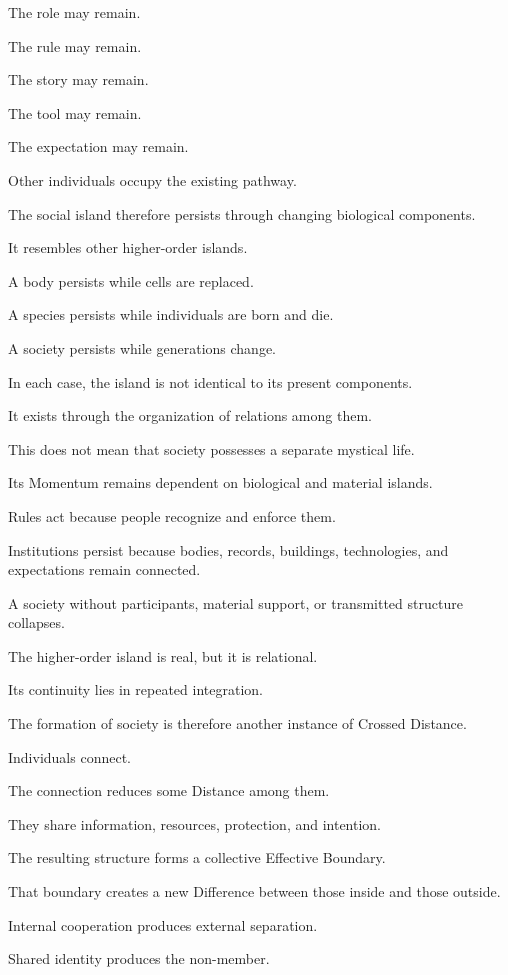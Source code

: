 The role may remain.

The rule may remain.

The story may remain.

The tool may remain.

The expectation may remain.

Other individuals occupy the existing pathway.

The social island therefore persists through changing biological components.

It resembles other higher-order islands.

A body persists while cells are replaced.

A species persists while individuals are born and die.

A society persists while generations change.

In each case, the island is not identical to its present components.

It exists through the organization of relations among them.

This does not mean that society possesses a separate mystical life.

Its Momentum remains dependent on biological and material islands.

Rules act because people recognize and enforce them.

Institutions persist because bodies, records, buildings, technologies, and expectations remain connected.

A society without participants, material support, or transmitted structure collapses.

The higher-order island is real, but it is relational.

Its continuity lies in repeated integration.

The formation of society is therefore another instance of Crossed Distance.

Individuals connect.

The connection reduces some Distance among them.

They share information, resources, protection, and intention.

The resulting structure forms a collective Effective Boundary.

That boundary creates a new Difference between those inside and those outside.

Internal cooperation produces external separation.

Shared identity produces the non-member.

